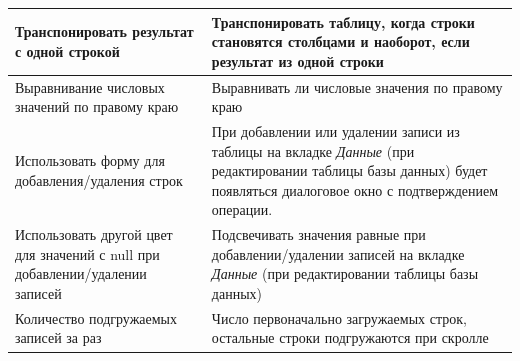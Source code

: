 \begin{longtable}[r]{|>{\ttfamily}m{5cm}|m{10.5cm}|}
	Транспонировать результат с одной строкой & Транспонировать таблицу, когда строки становятся столбцами и наоборот, если результат из одной строки \\\hline
	Выравнивание числовых значений по правому краю & Выравнивать ли числовые значения по правому краю\\\hline
	Использовать форму для добавления/удаления строк & При добавлении или удалении записи из таблицы на вкладке \textit{Данные} (при редактировании таблицы базы данных) будет появляться диалоговое окно с подтверждением операции. \\\hline
	Использовать другой цвет для значений с null при добавлении/удалении записей & Подсвечивать значения равные \ttt{NULL} при добавлении/удалении записей на вкладке \textit{Данные} (при редактировании таблицы базы данных) \\\hline
	Количество подгружаемых записей за раз & Число первоначально загружаемых строк, остальные строки подгружаются при скролле \\\hline
\end{longtable}

